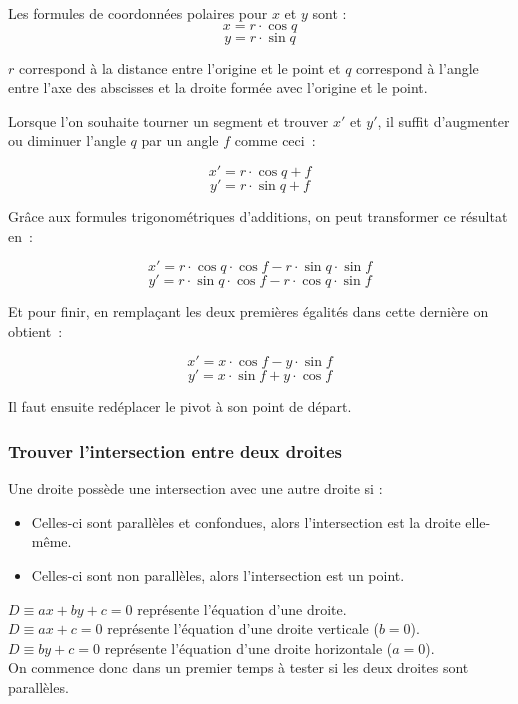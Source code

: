 \documentclass[]{report}
\begin{document}
Les formules de coordonnées polaires pour $ x $ et $ y $ sont :
$$ x = r \cdot \cos{q} $$ 
$$ y = r \cdot \sin{q} $$

$ r $ correspond à la distance entre l'origine et le point et $ q $ correspond 
à l'angle entre l'axe des abscisses et la droite formée avec l'origine et le point.

Lorsque l'on souhaite tourner un segment et trouver $ x' $ et $ y' $, 
il suffit d'augmenter ou diminuer l'angle $ q $ par un angle $ f $ comme ceci~:

$$ x' = r \cdot \cos{q + f} $$
$$ y' = r \cdot \sin{q + f} $$

Grâce aux formules trigonométriques d'additions, on peut transformer ce résultat en~:

$$ x' = r \cdot \cos{q} \cdot \cos{f} - r \cdot \sin{q} \cdot \sin{f} $$
$$ y' = r \cdot \sin{q} \cdot \cos{f} - r \cdot \cos{q} \cdot \sin{f} $$

Et pour finir, en remplaçant les deux premières égalités dans cette dernière on obtient~: 

$$ x' = x \cdot \cos{f} - y \cdot \sin{f} $$
$$ y' = x \cdot \sin{f} + y \cdot \cos{f} $$

Il faut ensuite redéplacer le pivot à son point de départ.

\newpage
\subsubsection{\label{AnnexeIntersects}Trouver l'intersection entre deux droites}

Une droite possède une intersection avec une autre droite si :
\begin{itemize}
    \item Celles-ci sont parallèles et confondues, alors l'intersection est la droite elle-même.
    \item Celles-ci sont non parallèles, alors l'intersection est un point. \\
\end{itemize} 

$ D \equiv ax + by + c = 0 $ représente l'équation d'une droite. \\
$ D \equiv ax + c = 0 $ représente l'équation d'une droite verticale ($b = 0$). \\
$ D \equiv by + c = 0 $ représente l'équation d'une droite horizontale ($a = 0$). \\

On commence donc dans un premier temps à tester si les deux droites sont parallèles. \\
\end{document}
